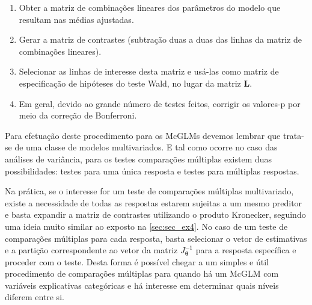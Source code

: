 \begin{enumerate}

  \item Obter a matriz de combinações lineares dos parâmetros do modelo que resultam nas médias ajustadas.
  
  \item Gerar a matriz de contrastes (subtração duas a duas das linhas da matriz de combinações lineares).
  
  \item Selecionar as linhas de interesse desta matriz e usá-las como matriz de especificação de hipóteses do teste Wald, no lugar da matriz $\boldsymbol{L}$.
  
  \item Em geral, devido ao grande número de testes feitos, corrigir os valores-p por meio da correção de Bonferroni.
  
\end{enumerate}

Para efetuação deste procedimento para os McGLMs devemos lembrar que trata-se de uma classe de modelos multivariados. E tal como ocorre no caso das análises de variância, para os testes comparações múltiplas existem duas possibilidades: testes para uma única resposta e testes para múltiplas respostas. 

Na prática, se o interesse for um teste de comparações múltiplas multivariado, existe a necessidade de todas as respostas estarem sujeitas a um mesmo preditor e basta expandir a matriz de contrastes utilizando o produto Kronecker, seguindo uma ideia muito similar ao exposto na \autoref{sec:sec_ex4}. No caso de um teste de comparações múltiplas para cada resposta, basta selecionar o vetor de estimativas e a partição correspondente ao vetor da matriz $J_{\boldsymbol{\theta}}^{-1}$ para a resposta específica e proceder com o teste. Desta forma é possível chegar a um simples e útil procedimento de comparações múltiplas para quando há um McGLM com variáveis explicativas categóricas e há interesse em determinar quais níveis diferem entre si.


